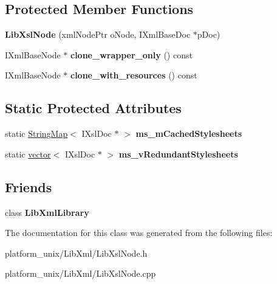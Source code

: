 \subsection*{\-Protected \-Member \-Functions}
\begin{DoxyCompactItemize}
\item 
\hypertarget{classgeneral__server_1_1LibXslNode_a02a5456acab5ce803f4fc8c6b50159c1}{{\bfseries \-Lib\-Xsl\-Node} (xml\-Node\-Ptr o\-Node, \-I\-Xml\-Base\-Doc $\ast$p\-Doc)}\label{classgeneral__server_1_1LibXslNode_a02a5456acab5ce803f4fc8c6b50159c1}

\item 
\hypertarget{classgeneral__server_1_1LibXslNode_aec1f063d1f882f195461495118a28ae8}{\-I\-Xml\-Base\-Node $\ast$ {\bfseries clone\-\_\-wrapper\-\_\-only} () const }\label{classgeneral__server_1_1LibXslNode_aec1f063d1f882f195461495118a28ae8}

\item 
\hypertarget{classgeneral__server_1_1LibXslNode_a48b57cce99ea34e8149d11a094763046}{\-I\-Xml\-Base\-Node $\ast$ {\bfseries clone\-\_\-with\-\_\-resources} () const }\label{classgeneral__server_1_1LibXslNode_a48b57cce99ea34e8149d11a094763046}

\end{DoxyCompactItemize}
\subsection*{\-Static \-Protected \-Attributes}
\begin{DoxyCompactItemize}
\item 
\hypertarget{classgeneral__server_1_1LibXslNode_a49b5f20b7c121147a56cd876fd3821a8}{static \hyperlink{classgeneral__server_1_1StringMap}{\-String\-Map}$<$ \-I\-Xsl\-Doc $\ast$ $>$ {\bfseries ms\-\_\-m\-Cached\-Stylesheets}}\label{classgeneral__server_1_1LibXslNode_a49b5f20b7c121147a56cd876fd3821a8}

\item 
\hypertarget{classgeneral__server_1_1LibXslNode_af5cd471695fd0a70b1b1fc7bddf48ce0}{static \hyperlink{classvector}{vector}$<$ \-I\-Xsl\-Doc $\ast$ $>$ {\bfseries ms\-\_\-v\-Redundant\-Stylesheets}}\label{classgeneral__server_1_1LibXslNode_af5cd471695fd0a70b1b1fc7bddf48ce0}

\end{DoxyCompactItemize}
\subsection*{\-Friends}
\begin{DoxyCompactItemize}
\item 
\hypertarget{classgeneral__server_1_1LibXslNode_ab76a8c8b514e08e13c811de729a94ce4}{class {\bfseries \-Lib\-Xml\-Library}}\label{classgeneral__server_1_1LibXslNode_ab76a8c8b514e08e13c811de729a94ce4}

\end{DoxyCompactItemize}


\-The documentation for this class was generated from the following files\-:\begin{DoxyCompactItemize}
\item 
platform\-\_\-unix/\-Lib\-Xml/\-Lib\-Xsl\-Node.\-h\item 
platform\-\_\-unix/\-Lib\-Xml/\-Lib\-Xsl\-Node.\-cpp\end{DoxyCompactItemize}
